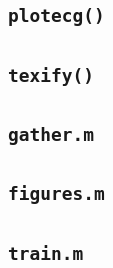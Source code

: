 \documentclass[12pt,letter]{article}
\begin{document}
\subsection{\texttt{plotecg()}}
\label{fun:plotecg}

\subsection{\texttt{texify()}}
\label{fun:tex}

\subsection{\texttt{gather.m}}
\label{scr:gather}

\subsection{\texttt{figures.m}}
\label{scr:figures}

\subsection{\texttt{train.m}}
\label{scr:train}




\end{document}
